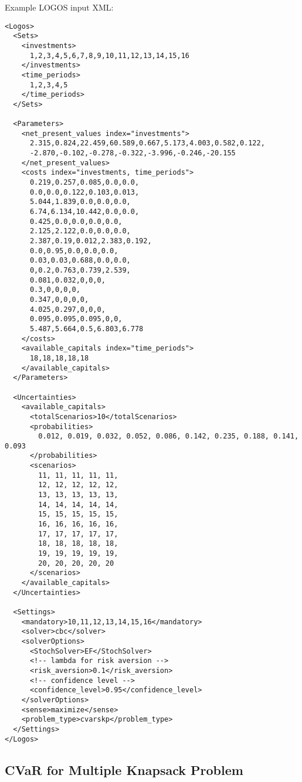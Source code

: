 Example LOGOS input XML:
\begin{lstlisting}[style=XML]
<Logos>
  <Sets>
    <investments>
      1,2,3,4,5,6,7,8,9,10,11,12,13,14,15,16
    </investments>
    <time_periods>
      1,2,3,4,5
    </time_periods>
  </Sets>

  <Parameters>
    <net_present_values index="investments">
      2.315,0.824,22.459,60.589,0.667,5.173,4.003,0.582,0.122,
      -2.870,-0.102,-0.278,-0.322,-3.996,-0.246,-20.155
    </net_present_values>
    <costs index="investments, time_periods">
      0.219,0.257,0.085,0.0,0.0,
      0.0,0.0,0.122,0.103,0.013,
      5.044,1.839,0.0,0.0,0.0,
      6.74,6.134,10.442,0.0,0.0,
      0.425,0.0,0.0,0.0,0.0,
      2.125,2.122,0.0,0.0,0.0,
      2.387,0.19,0.012,2.383,0.192,
      0.0,0.95,0.0,0.0,0.0,
      0.03,0.03,0.688,0.0,0.0,
      0,0.2,0.763,0.739,2.539,
      0.081,0.032,0,0,0,
      0.3,0,0,0,0,
      0.347,0,0,0,0,
      4.025,0.297,0,0,0,
      0.095,0.095,0.095,0,0,
      5.487,5.664,0.5,6.803,6.778
    </costs>
    <available_capitals index="time_periods">
      18,18,18,18,18
    </available_capitals>
  </Parameters>

  <Uncertainties>
    <available_capitals>
      <totalScenarios>10</totalScenarios>
      <probabilities>
        0.012, 0.019, 0.032, 0.052, 0.086, 0.142, 0.235, 0.188, 0.141, 0.093
      </probabilities>
      <scenarios>
        11, 11, 11, 11, 11,
        12, 12, 12, 12, 12,
        13, 13, 13, 13, 13,
        14, 14, 14, 14, 14,
        15, 15, 15, 15, 15,
        16, 16, 16, 16, 16,
        17, 17, 17, 17, 17,
        18, 18, 18, 18, 18,
        19, 19, 19, 19, 19,
        20, 20, 20, 20, 20
      </scenarios>
    </available_capitals>
  </Uncertainties>

  <Settings>
    <mandatory>10,11,12,13,14,15,16</mandatory>
    <solver>cbc</solver>
    <solverOptions>
      <StochSolver>EF</StochSolver>
      <!-- lambda for risk aversion -->
      <risk_aversion>0.1</risk_aversion>
      <!-- confidence level -->
      <confidence_level>0.95</confidence_level>
    </solverOptions>
    <sense>maximize</sense>
    <problem_type>cvarskp</problem_type>
  </Settings>
</Logos>
\end{lstlisting}


\subsection{CVaR for Multiple Knapsack Problem}
\label{subsec:CVaR_MKP}

